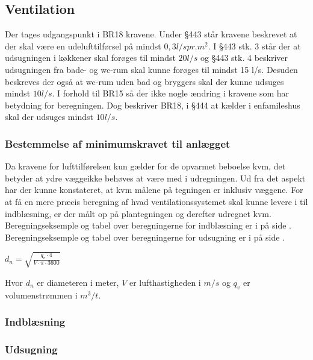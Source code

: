 \subsection{Ventilation} \label{sub:ventilation}
Der tages udgangspunkt i BR18 \cite{BR18:Online} kravene.
Under \S443 står kravene beskrevet at der skal være en udelufttilførsel på mindst $0,3 l/s pr. m^2$.
I \S443 stk. 3 står der at udsugningen i køkkener skal forøges til mindst $20 l/s$ og \S443 stk. 4 beskriver udsugningen fra bade- og wc-rum skal kunne forøges til mindst 15 l/s.
Desuden beskreves der også at wc-rum uden bad og bryggers skal der kunne udsuges mindst $10 l/s$. 
I forhold til BR15 så der ikke nogle ændring i kravene som har betydning for beregningen.
Dog beskriver BR18, i \S444 at kælder i enfamileshus skal der udsuges mindst $10 l/s$.

\subsubsection{Bestemmelse af minimumskravet til anlægget} \label{subsub:minimumkrav_ventilation}
Da kravene for lufttilførelsen kun gælder for de opvarmet beboelse kvm,
det betyder at ydre væggeikke behøves at være med i udregningen.
Ud fra det aspekt har der kunne konstateret, at kvm målene på tegningen er inklusiv væggene.
For at få en mere præcis beregning af hvad ventilationssystemet skal kunne levere i til indblæsning,
er der målt op på plantegningen og derefter udregnet kvm. \\
Beregningseksemple og tabel over beregningerne for indblæsning er i  på side \pageref{subsub:indblaesning_beregning}. \\
Beregningseksemple og tabel over beregningerne for udsugning er i  på side \pageref{subsub:udsugning_beregning}.

\begin{center}
    $
    d_{n} = \sqrt{ \frac{q_{v} \cdot 4}{V\cdot\pi\cdot3600}}
    $ \\ 
\end{center}

Hvor $d_n$ er diameteren i meter, $V$ er lufthastigheden i $m/s$ og $q_v$ er volumenstrømmen i $m^{3}/t$.

\subsubsection{Indblæsning}
\label{subsub:indblaesning}

\subsubsection{Udsugning}
\label{subsub:udsugning}